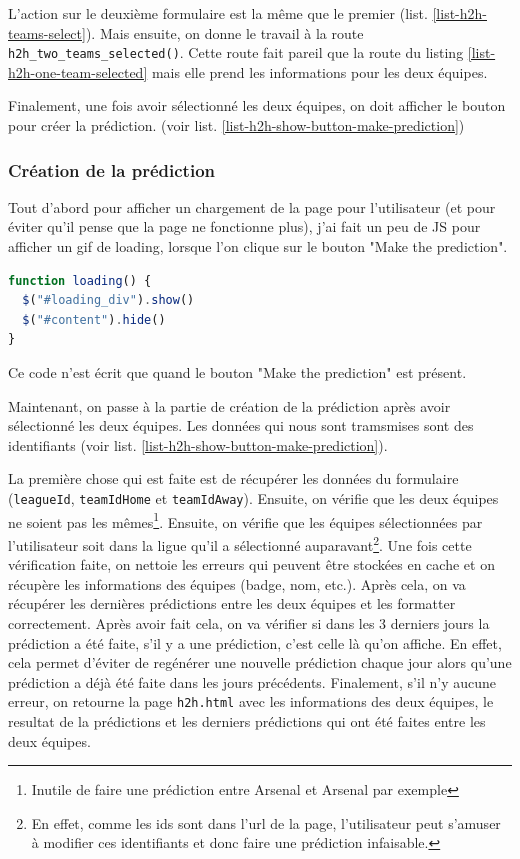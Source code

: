 \documentclass[a4paper,14pt]{extarticle}
\begin{document}
{L'action sur le deuxième formulaire est la même que le premier (list. \ref{list-h2h-teams-select}). Mais ensuite, on donne le travail à la route \texttt{h2h\_two\_teams\_selected()}. Cette route fait pareil que la route du listing \ref{list-h2h-one-team-selected} mais elle prend les informations pour les deux équipes.


Finalement, une fois avoir sélectionné les deux équipes, on doit afficher le bouton pour créer la prédiction. (voir list. \ref{list-h2h-show-button-make-prediction})


\subsubsection{Création de la prédiction}

Tout d'abord pour afficher un chargement de la page pour l'utilisateur (et pour éviter qu'il pense que la page ne fonctionne plus), j'ai fait un peu de JS pour afficher un gif de loading, lorsque l'on clique sur le bouton "Make the prediction". 

\begin{lstlisting}[language=JavaScript, firstnumber=1, caption=Affichage du loading lors de la création de la prédiction, captionpos=b, label=jsLoading]
function loading() {
  $("#loading_div").show()
  $("#content").hide()
}
\end{lstlisting}

Ce code n'est écrit que quand le bouton "Make the prediction" est présent.

Maintenant, on passe à la partie de création de la prédiction après avoir sélectionné les deux équipes. Les données qui nous sont tramsmises sont des identifiants (voir list. \ref{list-h2h-show-button-make-prediction}).

La première chose qui est faite est de récupérer les données du formulaire (\texttt{leagueId}, \texttt{teamIdHome} et \texttt{teamIdAway}). Ensuite, on vérifie que les deux équipes ne soient pas les mêmes\footnote{Inutile de faire une prédiction entre Arsenal et Arsenal par exemple}. Ensuite, on vérifie que les équipes sélectionnées par l'utilisateur soit dans la ligue qu'il a sélectionné auparavant\footnote{En effet, comme les ids sont dans l'url de la page, l'utilisateur peut s'amuser à modifier ces identifiants et donc faire une prédiction infaisable.}. Une fois cette vérification faite, on nettoie les erreurs qui peuvent être stockées en cache et on récupère les informations des équipes (badge, nom, etc.). Après cela, on va récupérer les dernières prédictions entre les deux équipes et les formatter correctement. Après avoir fait cela, on va vérifier si dans les 3 derniers jours la prédiction a été faite, s'il y a une prédiction, c'est celle là qu'on affiche. En effet, cela permet d'éviter de regénérer une nouvelle prédiction chaque jour alors qu'une prédiction a déjà été faite dans les jours précédents. Finalement, s'il n'y aucune erreur, on retourne la page \texttt{h2h.html} avec les informations des deux équipes, le resultat de la prédictions et les derniers prédictions qui ont été faites entre les deux équipes.

}
\end{document}
